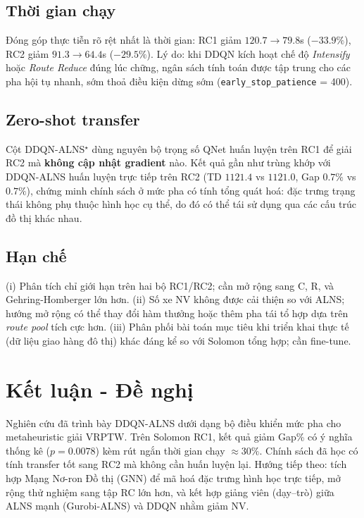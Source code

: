 \documentclass[13pt, a4paper]{extarticle} %
\begin{document}
\subsection{Thời gian chạy}
Đóng góp thực tiễn rõ rệt nhất là thời gian: RC1 giảm $120.7 \to 79.8$s ($-33.9\%$), RC2 giảm $91.3 \to 64.4$s ($-29.5\%$). Lý do: khi DDQN kích hoạt chế độ \textit{Intensify} hoặc \textit{Route Reduce} đúng lúc chững, ngân sách tính toán được tập trung cho các pha hội tụ nhanh, sớm thoả điều kiện dừng sớm (\texttt{early\_stop\_patience} = 400).

\subsection{Zero-shot transfer}
Cột DDQN-ALNS$^\star$ dùng nguyên bộ trọng số QNet huấn luyện trên RC1 để giải RC2 mà \textbf{không cập nhật gradient} nào. Kết quả gần như trùng khớp với DDQN-ALNS huấn luyện trực tiếp trên RC2 (TD $1121.4$ vs $1121.0$, Gap $0.7\%$ vs $0.7\%$), chứng minh chính sách ở mức pha có tính tổng quát hoá: đặc trưng trạng thái không phụ thuộc hình học cụ thể, do đó có thể tái sử dụng qua các cấu trúc đồ thị khác nhau.

\subsection{Hạn chế}
(i) Phân tích chỉ giới hạn trên hai bộ RC1/RC2; cần mở rộng sang C, R, và Gehring-Homberger lớn hơn. (ii) Số xe NV không được cải thiện so với ALNS; hướng mở rộng có thể thay đổi hàm thưởng hoặc thêm pha tái tổ hợp dựa trên \textit{route pool} tích cực hơn. (iii) Phân phối bài toán mục tiêu khi triển khai thực tế (dữ liệu giao hàng đô thị) khác đáng kể so với Solomon tổng hợp; cần fine-tune.

\section{Kết luận - Đề nghị}
Nghiên cứu đã trình bày DDQN-ALNS dưới dạng bộ điều khiển mức pha cho metaheuristic giải VRPTW. Trên Solomon RC1, kết quả giảm Gap\% có ý nghĩa thống kê ($p = 0.0078$) kèm rút ngắn thời gian chạy $\approx 30\%$. Chính sách đã học có tính transfer tốt sang RC2 mà không cần huấn luyện lại. Hướng tiếp theo: tích hợp Mạng Nơ-ron Đồ thị (GNN) để mã hoá đặc trưng hình học trực tiếp, mở rộng thử nghiệm sang tập RC lớn hơn, và kết hợp giảng viên (dạy--trò) giữa ALNS mạnh (Gurobi-ALNS) và DDQN nhằm giảm NV.
\end{document}
